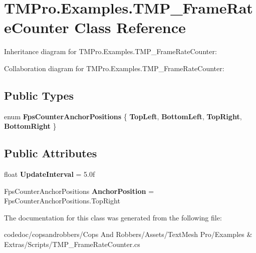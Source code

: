 \hypertarget{classTMPro_1_1Examples_1_1TMP__FrameRateCounter}{}\section{T\+M\+Pro.\+Examples.\+T\+M\+P\+\_\+\+Frame\+Rate\+Counter Class Reference}
\label{classTMPro_1_1Examples_1_1TMP__FrameRateCounter}


Inheritance diagram for T\+M\+Pro.\+Examples.\+T\+M\+P\+\_\+\+Frame\+Rate\+Counter\+:


Collaboration diagram for T\+M\+Pro.\+Examples.\+T\+M\+P\+\_\+\+Frame\+Rate\+Counter\+:
\subsection*{Public Types}
\begin{DoxyCompactItemize}
\item 
\mbox{\label{classTMPro_1_1Examples_1_1TMP__FrameRateCounter_af5d815df33bfd48fcbca765dbdc1a6e5}} 
enum {\bfseries Fps\+Counter\+Anchor\+Positions} \{ {\bfseries Top\+Left}, 
{\bfseries Bottom\+Left}, 
{\bfseries Top\+Right}, 
{\bfseries Bottom\+Right}
 \}
\end{DoxyCompactItemize}
\subsection*{Public Attributes}
\begin{DoxyCompactItemize}
\item 
\mbox{\label{classTMPro_1_1Examples_1_1TMP__FrameRateCounter_ae8d84e2e21d6d819d48f594b09b0319b}} 
float {\bfseries Update\+Interval} = 5.\+0f
\item 
\mbox{\label{classTMPro_1_1Examples_1_1TMP__FrameRateCounter_a7c92928be05c154b10c2eb092425e865}} 
Fps\+Counter\+Anchor\+Positions {\bfseries Anchor\+Position} = Fps\+Counter\+Anchor\+Positions.\+Top\+Right
\end{DoxyCompactItemize}


The documentation for this class was generated from the following file\+:\begin{DoxyCompactItemize}
\item 
codedoc/copsandrobbers/\+Cops And Robbers/\+Assets/\+Text\+Mesh Pro/\+Examples \& Extras/\+Scripts/T\+M\+P\+\_\+\+Frame\+Rate\+Counter.\+cs\end{DoxyCompactItemize}
